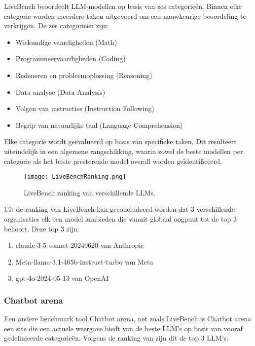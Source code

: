     LiveBench beoordeelt LLM-modellen op basis van zes categorieën. Binnen elke categorie worden meerdere taken uitgevoerd om een nauwkeurige beoordeling te verkrijgen. De zes categorieën zijn:
    \begin{itemize}
        \item Wiskundige vaardigheden (Math)
        \item Programmeervaardigheden (Coding)
        \item Redeneren en probleemoplossing (Reasoning)
        \item Data-analyse (Data Analysis)
        \item Volgen van instructies (Instruction Following)
        \item Begrip van natuurlijke taal (Language Comprehension)
    \end{itemize}
    
    Elke categorie wordt geëvalueerd op basis van specifieke taken. Dit resulteert uiteindelijk in een algemene rangschikking, waarin zowel de beste modellen per categorie als het beste presterende model overall worden geïdentificeerd.
    
    \begin{figure}[H]
        \centering
        \texttt{[image: LiveBenchRanking.png]}
        \caption{LiveBench ranking van verschillende LLMs.}
        \label{fig:livebench}
    \end{figure}
    
    Uit de ranking van LiveBench kan geconcludeerd worden dat 3 verschillende organisaties elk een model aanbieden die vanuit globaal oogpunt tot de top 3 behoort. Deze top 3 zijn: 
    \begin{enumerate}
        \item claude-3-5-sonnet-20240620 van Anthropic
        \item Meta-llama-3.1-405b-instruct-turbo van Meta
        \item gpt-4o-2024-05-13 van OpenAI
    \end{enumerate}
    
    \subsubsection{Chatbot arena} 
    
    Een andere benchmark tool Chatbot arena, net zoals LiveBench is Chatbot arena een site die een actuele weergave biedt van de beste LLM's op basis van vooraf gedefinieerde categorieën. 
    Volgens de ranking van \textcite{LiveBench2025} zijn dit de top 3 LLM's:
    
